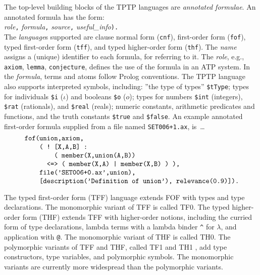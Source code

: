 \documentclass[runningheads]{llncs}
\begin{document}
The top-level building blocks of the TPTP languages are {\em annotated formulae}.
An annotated formula has the form:\\
 {\em role}{\tt ,} {\em formula}{\tt ,} 
{\em source}{\tt ,} {\em useful\_info}{\tt ).} \\ 
The {\em language}s supported are clause normal form ({\tt cnf}), first-order form ({\tt fof}), 
typed first-order form ({\tt tff}), and typed higher-order form ({\tt thf}).
The {\em name} assigns a (unique) identifier to each formula, for referring to it.
The {\em role}, e.g., {\tt axiom}, {\tt lemma}, {\tt conjecture}, defines the use of the formula 
in an ATP system.
In the {\em formula}, terms and atoms follow Prolog conventions.
The TPTP language also supports interpreted symbols, including: 
''the type of types'' {\tt \$tType};
types for individuals {\tt \$i} ($\iota$) and booleans {\tt \$o} ($o$);
types for numbers {\tt \$int} (integers), {\tt \$rat} (rationals), and {\tt \$real} (reals);
numeric constants,
arithmetic predicates and functions,
and
the truth constants {\tt \$true} and {\tt \$false}.
An example annotated first-order formula supplied from a file named {\tt SET006+1.ax}, is~\ldots
\[
\begin{minipage}{\textwidth}
\begin{verbatim}
    fof(union,axiom,
        ( ! [X,A,B] :
            ( member(X,union(A,B))
          <=> ( member(X,A) | member(X,B) ) ),
        file('SET006+0.ax',union),
        [description('Definition of union'), relevance(0.9)]).
\end{verbatim}
\end{minipage}
\]

The typed first-order form (TFF) language extends FOF with types and type declarations.
The monomorphic variant of TFF is called TF0.
The typed higher-order form (THF) extends TFF with higher-order notions, including the
curried form of type declarations, lambda terms with a lambda 
binder {\tt \verb|^|} for $\lambda$, and application with {\tt @}.
The monomorphic variant of THF is called TH0.
The polymorphic variants of TFF and THF, called TF1 \cite{BP13-TFF1} and TH1 \cite{KSR16},
add type constructors, type variables, and polymorphic symbols.
The monomorphic variants are currently more widespread than the polymorphic variants.
\end{document}
